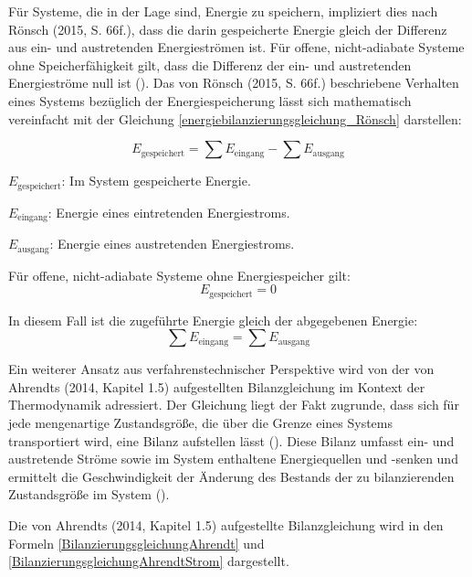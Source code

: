 Für Systeme, die in der Lage sind, Energie zu speichern, impliziert dies nach Rönsch (2015, S. 66f.), dass die darin gespeicherte Energie gleich der 
Differenz aus ein- und austretenden Energieströmen ist.
Für offene, nicht-adiabate Systeme ohne Speicherfähigkeit gilt, dass die Differenz der ein- und austretenden Energieströme null ist (\cite[S. 66f.]{Rönsch.2015}).
Das von Rönsch (2015, S. 66f.) beschriebene Verhalten eines Systems bezüglich der Energiespeicherung lässt sich mathematisch vereinfacht mit der Gleichung 
\eqref{energiebilanzierungsgleichung_Rönsch} darstellen:

\begin{equation}
E_{\text{gespeichert}} = \sum E_{\text{eingang}} - \sum E_{\text{ausgang}}
\label{energiebilanzierungsgleichung_Rönsch}
\end{equation}

\begin{description}
    \item \(E_{\text{gespeichert}}\): Im System gespeicherte Energie.
    \item \(E_{\text{eingang}}\): Energie eines eintretenden Energiestroms.
    \item \(E_{\text{ausgang}}\): Energie eines austretenden Energiestroms.
    \item Für offene, nicht-adiabate Systeme ohne Energiespeicher gilt:
    \[
    E_{\text{gespeichert}} = 0
    \]
    \item In diesem Fall ist die zugeführte Energie gleich der abgegebenen Energie:
    \[
    \sum E_{\text{eingang}} = \sum E_{\text{ausgang}}
    \]
\end{description}

Ein weiterer Ansatz aus verfahrenstechnischer Perspektive wird von der von Ahrendts (2014, Kapitel 1.5) aufgestellten Bilanzgleichung im Kontext der Thermodynamik 
adressiert.
Der Gleichung liegt der Fakt zugrunde, dass sich für jede mengenartige Zustandsgröße, die über die Grenze eines Systems transportiert wird, eine Bilanz aufstellen lässt 
(\cite[Kapitel 1.5]{Ahrendts.2014}).
Diese Bilanz umfasst ein- und austretende Ströme sowie im System enthaltene Energiequellen und -senken und ermittelt die Geschwindigkeit der Änderung des Bestands der 
zu bilanzierenden Zustandsgröße im System (\cite[Kapitel 1.5]{Ahrendts.2014}).

Die von Ahrendts (2014, Kapitel 1.5) aufgestellte Bilanzgleichung wird in den Formeln \eqref{BilanzierungsgleichungAhrendt} und 
\eqref{BilanzierungsgleichungAhrendtStrom} dargestellt.

